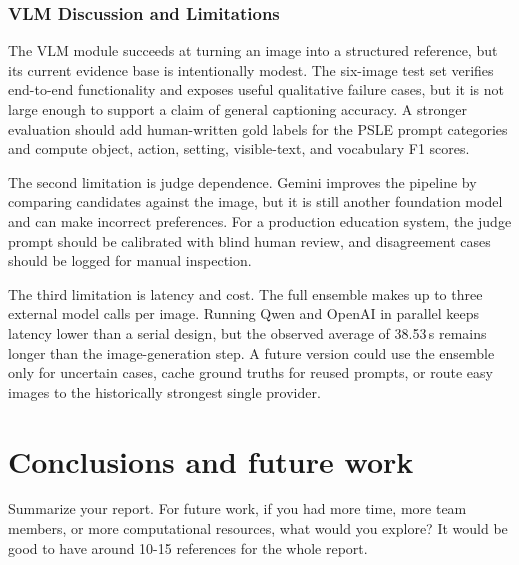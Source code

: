 \documentclass{article}
\begin{document}
\subsubsection{VLM Discussion and Limitations}
\label{sec:vlm-discussion}

The VLM module succeeds at turning an image into a structured reference,
but its current evidence base is intentionally modest. The six-image
test set verifies end-to-end functionality and exposes useful qualitative
failure cases, but it is not large enough to support a claim of general
captioning accuracy. A stronger evaluation should add human-written gold
labels for the PSLE prompt categories and compute object, action,
setting, visible-text, and vocabulary F1 scores.

The second limitation is judge dependence. Gemini improves the pipeline
by comparing candidates against the image, but it is still another
foundation model and can make incorrect preferences. For a production
education system, the judge prompt should be calibrated with blind human
review, and disagreement cases should be logged for manual inspection.

The third limitation is latency and cost. The full ensemble makes up to
three external model calls per image. Running Qwen and OpenAI in parallel
keeps latency lower than a serial design, but the observed average of
38.53\,s remains longer than the image-generation step. A future version
could use the ensemble only for uncertain cases, cache ground truths for
reused prompts, or route easy images to the historically strongest
single provider.

\section{Conclusions and future work}
Summarize your report. For future work, if you had more time, more team members, or more computational resources, what would you explore? It would be good to have around 10-15 references \cite{He16CVPR} for the whole report.
\end{document}
